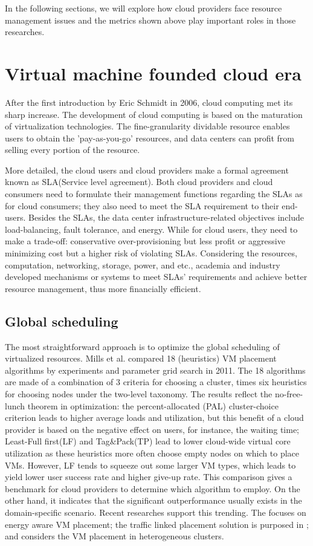 \documentclass[sigchi]{acmart}
\begin{document}
In the following sections, we will explore how cloud providers face resource management issues and the metrics shown above play important roles in  those researches.

\section{Virtual machine founded cloud era}

After the first introduction by Eric Schmidt in 2006, cloud computing met its sharp increase.
The development of cloud computing is based on the maturation of virtualization technologies. 
The fine-granularity dividable resource enables users to obtain the 'pay-as-you-go' resources, and data centers can profit from selling every portion of the resource.

More detailed, the cloud users and cloud providers make a formal agreement known as SLA(Service level agreement).
Both cloud providers and cloud consumers need to formulate their management functions regarding the SLAs as for cloud consumers; they also need to meet the SLA requirement to their end-users.
Besides the SLAs, the data center infrastructure-related objectives include load-balancing, fault tolerance, and energy.
While for cloud users, they need to make a trade-off: conservative over-provisioning but less profit or aggressive minimizing cost but a higher risk of violating SLAs.
Considering the resources, computation, networking, storage, power, and etc., academia and industry developed mechanisms or systems to meet SLAs' requirements and achieve better resource management, thus more financially efficient. 
\subsection{Global scheduling}
The most straightforward approach is to optimize the global scheduling of virtualized resources.
Mills et al. compared 18 (heuristics) VM placement algorithms by experiments and parameter grid search\cite{mills2011comparing} in 2011.
The 18 algorithms are made of a combination of 3 criteria for choosing a cluster, times six heuristics for choosing nodes under the two-level taxonomy.
The results reflect the no-free-lunch theorem in optimization: the percent-allocated (PAL) cluster-choice criterion leads to higher average loads and utilization, but this benefit of a cloud provider is based on the negative effect on users, for instance, the waiting time; 
Least-Full first(LF) and Tag\&Pack(TP) lead to lower cloud-wide virtual core utilization as these heuristics more often choose empty nodes on which to place VMs. However, LF  tends to squeeze out some larger VM types, which leads to yield lower user success rate and higher give-up rate.
This comparison gives a benchmark for cloud providers to determine which algorithm to employ. On the other hand, it indicates that the significant outperformance usually exists in the domain-specific scenario.
Recent researches support this trending. The \cite{moges2019energy} focuses on energy aware VM placement; the traffic linked placement solution is purposed in \cite{liwei2020online}; and \cite{kim2019holistic} considers the VM placement in heterogeneous clusters.
\end{document}
